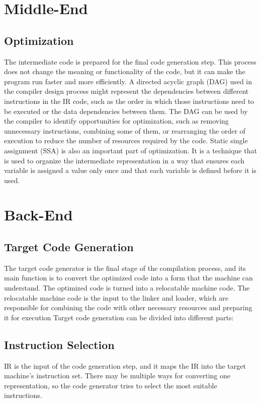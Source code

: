 \section{Middle-End}

\subsection{Optimization}
The intermediate code is prepared for the final code generation step. This process does not change the meaning or functionality of the code, but it can make the program run faster and more efficiently.
A directed acyclic graph (DAG) used in the compiler design process might represent the dependencies between different instructions in the IR code, such as the order in which those instructions need to be executed or the data dependencies between them. The DAG can be used by the compiler to identify opportunities for optimization, such as removing unnecessary instructions, combining some of them, or rearranging the order of execution to reduce the number of resources required by the code.
Static single assignment (SSA) is also an important part of optimization. It is a technique that is used to organize the intermediate representation in a way that ensures each variable is assigned a value only once and that each variable is defined before it is used.

\section{Back-End}



\subsection{Target Code Generation}
The target code generator is the final stage of the compilation process, and its main function is to convert the optimized code into a form that the machine can understand. The optimized code is turned into a relocatable machine code. The relocatable machine code is the input to the linker and loader, which are responsible for combining the code with other necessary resources and preparing it for execution %
Target code generation can be divided into different parts:

\subsection{Instruction Selection} 
IR is the input of the code generation step, and it maps the IR into the target machine’s instruction set. There may be multiple ways for converting one representation, so the code generator tries to select the most suitable instructions.

